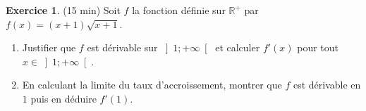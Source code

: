 \documentclass{exam}
\theoremstyle{definition}
\newtheorem{exercice}{Exercice}
\begin{document}

\begin{exercice}{(15 min)}
    Soit $f$ la fonction définie sur $\mathbb{R}^+$ par $f(x) = (x+1)\sqrt{x+1}$.
    \begin{enumerate}
        \item Justifier que $f$ est dérivable sur $\left]1; +\infty\right[$ et calculer $f'(x)$ pour tout $x \in \left]1; +\infty\right[$.
        \item En calculant la limite du taux d'accroissement, montrer que $f$ est dérivable en $1$ puis en déduire $f'(1)$.
    \end{enumerate}
    \end{exercice}
    
\end{document}

